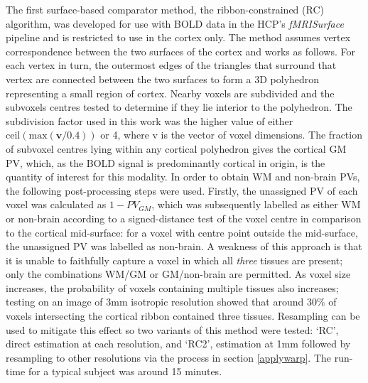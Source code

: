 \documentclass[12pt]{report}
\renewcommand{\vec}[1]{\mathbf{#1}}
\begin{document}
The first surface-based comparator method, the ribbon-constrained (RC) algorithm, was developed for use with BOLD data in the HCP’s \textit{fMRISurface} pipeline \cite{Glasser2013} and is restricted to use in the cortex only. The method assumes vertex correspondence between the two surfaces of the cortex and works as follows. For each vertex in turn, the outermost edges of the triangles that surround that vertex are connected between the two surfaces to form a 3D polyhedron representing a small region of cortex. Nearby voxels are subdivided and the subvoxels centres tested to determine if they lie interior to the polyhedron. The subdivision factor used in this work was the higher value of either $\mathrm{ceil}( \mathrm{max} (\vec{v}/0.4) )$ or 4, where v is the vector of voxel dimensions. The fraction of subvoxel centres lying within any cortical polyhedron gives the cortical GM PV, which, as the BOLD signal is predominantly cortical in origin, is the quantity of interest for this modality. In order to obtain WM and non-brain PVs, the following post-processing steps were used. Firstly, the unassigned PV of each voxel was calculated as $1-PV_{GM}$, which was subsequently labelled as either WM or non-brain according to a signed-distance test of the voxel centre in comparison to the cortical mid-surface: for a voxel with centre point outside the mid-surface, the unassigned PV was labelled as non-brain. A weakness of this approach is that it is unable to faithfully capture a voxel in which all \textit{three} tissues are present; only the combinations WM/GM or GM/non-brain are permitted. As voxel size increases, the probability of voxels containing multiple tissues also increases; testing on an image of 3mm isotropic resolution showed that around 30\% of voxels intersecting the cortical ribbon contained three tissues. Resampling can be used to mitigate this effect so two variants of this method were tested: ‘RC’, direct estimation at each resolution, and ‘RC2’, estimation at 1mm followed by resampling to other resolutions via the process in section \ref{applywarp}. The run-time for a typical subject was around 15 minutes. 
\end{document}
